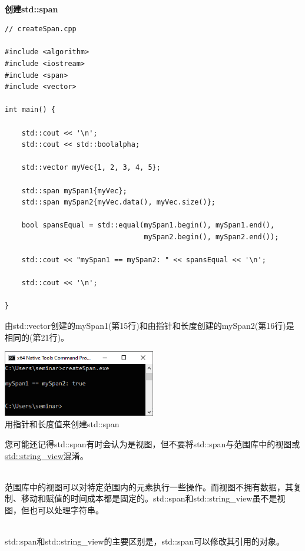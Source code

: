 \hspace*{\fill} \\ %
\noindent
\textbf{创建std::span}
\begin{lstlisting}[style=styleCXX]
// createSpan.cpp

#include <algorithm>
#include <iostream>
#include <span>
#include <vector>

int main() {
	
	std::cout << '\n';
	std::cout << std::boolalpha;
	
	std::vector myVec{1, 2, 3, 4, 5};
	
	std::span mySpan1{myVec};
	std::span mySpan2{myVec.data(), myVec.size()};
	
	bool spansEqual = std::equal(mySpan1.begin(), mySpan1.end(),
	                             mySpan2.begin(), mySpan2.end());
	
	std::cout << "mySpan1 == mySpan2: " << spansEqual << '\n';
	
	std::cout << '\n';

}
\end{lstlisting}

由std::vector创建的mySpan1(第15行)和由指针和长度创建的mySpan2(第16行)是相同的(第21行)。

\begin{center}
\includegraphics[width=0.5\textwidth]{content/3/chapter5/images/6.png}\\
用指针和长度值来创建std::span
\end{center}

\begin{tcolorbox}[breakable,enhanced jigsaw,colback=red!5!white,colframe=red!75!black,title={std::span既不是std::string\_view也不是视图}]
	
您可能还记得std::span有时会认为是视图，但不要将std::span与范围库中的视图或\href{https://www.modernescpp.com/index.php/c-17-what-s-new-in-the-library}{std::string\_view}混淆。

\hspace*{\fill} \\ %
范围库中的视图可以对特定范围内的元素执行一些操作。而视图不拥有数据，其复制、移动和赋值的时间成本都是固定的。std::span和std::string\_view虽不是视图，但也可以处理字符串。

\hspace*{\fill} \\ %
std::span和std::string\_view的主要区别是，std::span可以修改其引用的对象。
\end{tcolorbox}
	
